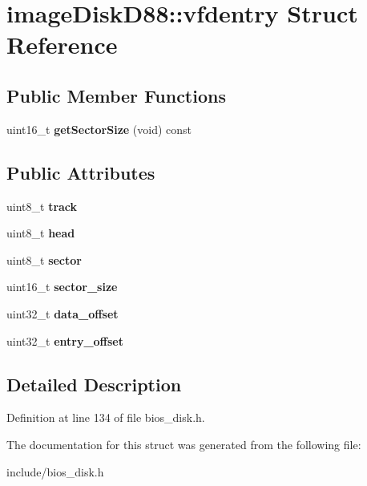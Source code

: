 \hypertarget{structimageDiskD88_1_1vfdentry}{\section{image\-Disk\-D88\-:\-:vfdentry Struct Reference}
\label{structimageDiskD88_1_1vfdentry}
}
\subsection*{Public Member Functions}
\begin{DoxyCompactItemize}
\item 
\hypertarget{structimageDiskD88_1_1vfdentry_a308243cc68ff88697a893f66c99243e5}{uint16\-\_\-t {\bfseries get\-Sector\-Size} (void) const }\label{structimageDiskD88_1_1vfdentry_a308243cc68ff88697a893f66c99243e5}

\end{DoxyCompactItemize}
\subsection*{Public Attributes}
\begin{DoxyCompactItemize}
\item 
\hypertarget{structimageDiskD88_1_1vfdentry_ab6be8861bab810343858d2b3eb2c80cd}{uint8\-\_\-t {\bfseries track}}\label{structimageDiskD88_1_1vfdentry_ab6be8861bab810343858d2b3eb2c80cd}

\item 
\hypertarget{structimageDiskD88_1_1vfdentry_a9d77966ce846181817e786de4c17f005}{uint8\-\_\-t {\bfseries head}}\label{structimageDiskD88_1_1vfdentry_a9d77966ce846181817e786de4c17f005}

\item 
\hypertarget{structimageDiskD88_1_1vfdentry_acca39005f709d218d88f31f7f4622cb4}{uint8\-\_\-t {\bfseries sector}}\label{structimageDiskD88_1_1vfdentry_acca39005f709d218d88f31f7f4622cb4}

\item 
\hypertarget{structimageDiskD88_1_1vfdentry_a38d94595d696210f20897f239fa39e44}{uint16\-\_\-t {\bfseries sector\-\_\-size}}\label{structimageDiskD88_1_1vfdentry_a38d94595d696210f20897f239fa39e44}

\item 
\hypertarget{structimageDiskD88_1_1vfdentry_a39b1b5ef8922b2b16a63d207b155d49c}{uint32\-\_\-t {\bfseries data\-\_\-offset}}\label{structimageDiskD88_1_1vfdentry_a39b1b5ef8922b2b16a63d207b155d49c}

\item 
\hypertarget{structimageDiskD88_1_1vfdentry_aa58f7c17c694ab100aa242aa90b45868}{uint32\-\_\-t {\bfseries entry\-\_\-offset}}\label{structimageDiskD88_1_1vfdentry_aa58f7c17c694ab100aa242aa90b45868}

\end{DoxyCompactItemize}


\subsection{Detailed Description}


Definition at line 134 of file bios\-\_\-disk.\-h.



The documentation for this struct was generated from the following file\-:\begin{DoxyCompactItemize}
\item 
include/bios\-\_\-disk.\-h\end{DoxyCompactItemize}
